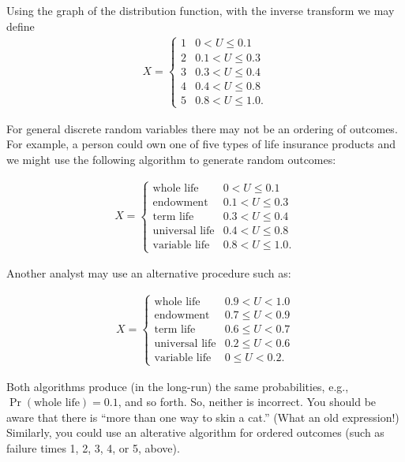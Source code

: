 \documentclass[]{book}
\theoremstyle{definition}
\theoremstyle{definition}
\theoremstyle{definition}
\theoremstyle{remark}
\begin{document}
Using the graph of the distribution function, with the inverse transform
we may define \[\begin{aligned}
X = \left\{ \begin{array}{cc}
              1 &   0<U  \leq 0.1  \\
              2 &  0.1 < U  \leq  0.3\\
              3 &  0.3 < U  \leq  0.4\\
              4 &  0.4 < U  \leq  0.8  \\
              5 &  0.8 < U  \leq  1.0     .
            \end{array} \right.\end{aligned}\]

For general discrete random variables there may not be an ordering of
outcomes. For example, a person could own one of five types of life
insurance products and we might use the following algorithm to generate
random outcomes:

\[\begin{aligned}
X = \left\{ \begin{array}{cc}
  \textrm{whole life} &   0<U  \leq 0.1  \\
 \textrm{endowment} &  0.1 < U  \leq  0.3\\
\textrm{term life} &  0.3 < U  \leq  0.4\\
  \textrm{universal life} &  0.4 < U  \leq  0.8  \\
  \textrm{variable life} &  0.8 < U  \leq  1.0 .
            \end{array} \right.\end{aligned}\]

Another analyst may use an alternative procedure such as:

\[\begin{aligned}
X = \left\{ \begin{array}{cc}
  \textrm{whole life} &   0.9<U<1.0  \\
 \textrm{endowment} &  0.7 \leq U < 0.9\\
\textrm{term life} &  0.6 \leq U < 0.7\\
  \textrm{universal life} &  0.2 \leq U < 0.6  \\
  \textrm{variable life} &  0 \leq U < 0.2 .
            \end{array} \right.\end{aligned}\]

Both algorithms produce (in the long-run) the same probabilities, e.g.,
\(\Pr(\textrm{whole life})=0.1\), and so forth. So, neither is
incorrect. You should be aware that there is ``more than one way to skin
a cat.'' (What an old expression!) Similarly, you could use an
alterative algorithm for ordered outcomes (such as failure times 1, 2,
3, 4, or 5, above).
\end{document}
